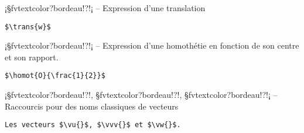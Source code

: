 \documentclass[11pt,a4paper,rgb]{report}
\begin{document}
\setlength{\leftskip}{0pt}
\setlength{\textwidth}{18cm}%


\vspace*{.75cm}

\inCodeStub¡§fvtextcolor?bordeau!?!¡ -- Expression d'une translation

\setlength{\leftskip}{.75cm}%
\setlength{\textwidth}{17.25cm}%

\colorbox{blue!15}{}
\hfill
\begin{minipage}{.65\textwidth}
	\begin{lstlisting}[linewidth=\textwidth, language={[LaTeX]TeX}]
	$\trans{w}$
	\end{lstlisting}
\end{minipage}

\setlength{\leftskip}{0pt}
\setlength{\textwidth}{18cm}%


\vspace*{.75cm}

\inCodeStub¡§fvtextcolor?bordeau!?!¡ -- Expression d'une homothétie en fonction de son centre et son rapport.

\setlength{\leftskip}{.75cm}%
\setlength{\textwidth}{17.25cm}%

\colorbox{blue!15}{}
\hfill
\begin{minipage}{.65\textwidth}
	\begin{lstlisting}[linewidth=\textwidth, language={[LaTeX]TeX}]
	$\homot{O}{\frac{1}{2}}$
	\end{lstlisting}
\end{minipage}

\setlength{\leftskip}{0pt}
\setlength{\textwidth}{18cm}%


\vspace*{.75cm}

\inCodeStub¡§fvtextcolor?bordeau!?\vu{}!, §fvtextcolor?bordeau!?\vvv{}!, §fvtextcolor?bordeau!?\vw{}!¡ -- Raccourcis pour des noms classiques de vecteurs

\setlength{\leftskip}{.75cm}%
\setlength{\textwidth}{17.25cm}%

\colorbox{blue!15}{}
\hfill
\begin{minipage}{.65\textwidth}
	\begin{lstlisting}[linewidth=\textwidth, language={[LaTeX]TeX}]
	Les vecteurs $\vu{}$, $\vvv{}$ et $\vw{}$.
	\end{lstlisting}
\end{minipage}
\end{document}
